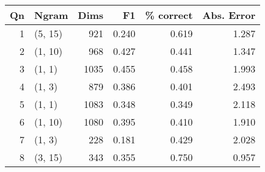 \begin{tabular}{rlrrrr}
\toprule
 Qn &    Ngram &  Dims &     F1 &  \% correct &  Abs. Error \\
\midrule
  1 &  (5, 15) &   921 &  0.240 &      0.619 &       1.287 \\
  2 &  (1, 10) &   968 &  0.427 &      0.441 &       1.347 \\
  3 &   (1, 1) &  1035 &  0.455 &      0.458 &       1.993 \\
  4 &   (1, 3) &   879 &  0.386 &      0.401 &       2.493 \\
  5 &   (1, 1) &  1083 &  0.348 &      0.349 &       2.118 \\
  6 &  (1, 10) &  1080 &  0.395 &      0.410 &       1.910 \\
  7 &   (1, 3) &   228 &  0.181 &      0.429 &       2.028 \\
  8 &  (3, 15) &   343 &  0.355 &      0.750 &       0.957 \\
\bottomrule
\end{tabular}
